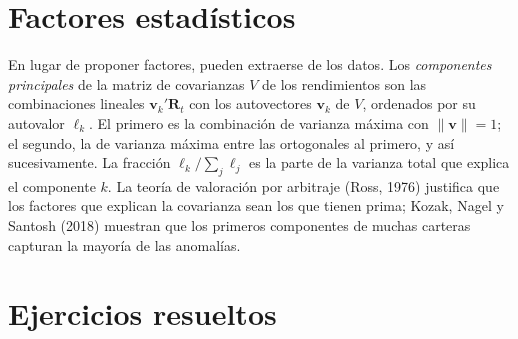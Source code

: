 \section{Factores estadísticos}

En lugar de proponer factores, pueden extraerse de los datos. Los \emph{componentes principales} de la matriz de
covarianzas $V$ de los rendimientos son las combinaciones lineales $\mathbf v_k'\mathbf R_t$ con los autovectores
$\mathbf v_k$ de $V$, ordenados por su autovalor $\ell_k$. El primero es la combinación de varianza máxima con
$\|\mathbf v\|=1$; el segundo, la de varianza máxima entre las ortogonales al primero, y así sucesivamente. La fracción
$\ell_k/\sum_j\ell_j$ es la parte de la varianza total que explica el componente $k$. La teoría de valoración por
arbitraje (Ross, 1976) justifica que los factores que explican la covarianza sean los que tienen prima; Kozak, Nagel y
Santosh (2018) muestran que los primeros componentes de muchas carteras capturan la mayoría de las anomalías.

\section{Ejercicios resueltos}

